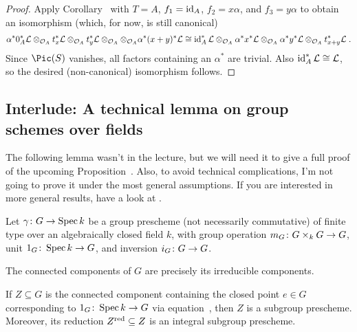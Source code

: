 \documentclass[a4paper,parskip=half,numbers=enddot, DIV=12]{scrreprt}
\begin{document}
\begin{proof}
	Apply Corollary~ with $T=A$, $f_1=\operatorname{id}_A$, $f_2=x\alpha$, and $f_3=y\alpha$ to obtain an isomorphism (which, for now, is still canonical)
	\begin{align*}
		 \alpha^*0_A^*\mathcal{L}\otimes_{\mathcal{O}_A}t_x^*\mathcal{L}\otimes_{\mathcal{O}_A}t_y^*\mathcal{L}\otimes_{\mathcal{O}_A}\otimes_{\mathcal{O}_A}\alpha^*(x+y)^*\mathcal{L}\cong \operatorname{id}_A^*\mathcal{L}\otimes_{\mathcal{O}_A}\alpha^*x^*\mathcal{L}\otimes_{\mathcal{O}_A}\alpha^*y^*\mathcal{L}\otimes_{\mathcal{O}_A}t_{x+y}^*\mathcal{L}\;.
	\end{align*}
	Since $\Pic(S)$ vanishes, all factors containing an $\alpha^*$ are trivial. Also $\operatorname{id}_A^*\mathcal{L}\cong \mathcal{L}$, so the desired (non-canonical) isomorphism follows.
\end{proof}
\subsection{Interlude: A technical lemma on group schemes over fields}
The following lemma wasn't in the lecture, but we will need it to give a full proof of the upcoming Proposition~. Also, to avoid technical complications, I'm not going to prove it under the most general assumptions. If you are interested in more general results, have a look at \cite[]{stacks-project}.
\begin{lem}
	Let $\gamma\colon G\morphism\Spec k$ be a group prescheme (not necessarily commutative) of finite type over an algebraically closed field $k$, with group operation $m_G\colon G\times_kG\morphism G$, unit $1_G\colon \Spec k\morphism G$, and inversion $i_G\colon G\morphism G$.
	\begin{alphanumerate}
		\item The connected components of $G$ are precisely its irreducible components.
		\item If $Z\subseteq G$ is the connected component containing the closed point $e\in G$ corresponding to $1_G\colon \Spec k\morphism G$ via equation~, then $Z$ is a subgroup prescheme. Moreover, its reduction $Z^{\mathrm{red}}\subseteq Z$ is an integral subgroup prescheme.
	\end{alphanumerate}
\end{lem}
\end{document}
